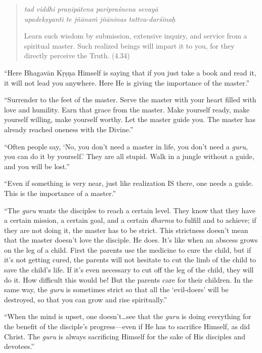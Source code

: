 \documentclass[12pt, twoside, openright]{memoir}
\begin{document}
\par
\begin{verse}
\textit{tad viddhi praṇipātena paripraśnena sevayā} \\
\textit{upadekṣyanti te jñānaṁ jñāninas tattva-darśinaḥ}

\noindent Learn such wisdom by submission, extensive inquiry, and service from a spiritual master. Such realized beings will impart it to you, for they directly perceive the Truth. (4.34)
\end{verse}
\par


\enquote{Here Bhagavān Kṛṣṇa Himself is saying that if you just take a book and read it, it will not lead you anywhere. Here He is giving the importance of the master.}

\enquote{Surrender to the feet of the master. Serve the master with your heart filled with love and humility. Earn that grace from the master. Make yourself ready, make yourself willing, make yourself worthy. Let the master guide you. The master has already reached oneness with the Divine.}

\enquote{Often people say, \enquote{No, you don’t need a master in life, you don’t need a \textit{guru}, you can do it by yourself.} They are all stupid. Walk in a jungle without a guide, and you will be lost.}

\enquote{Even if something is very near, just like realization IS there, one needs a guide. This is the importance of a master.}

\enquote{The \textit{guru} wants the disciples to reach a certain level. They know that they have a certain mission, a certain goal, and a certain \textit{dharma} to fulfill and to achieve; if they are not doing it, the master has to be strict. This strictness doesn’t mean that the master doesn’t love the disciple. He does. It’s like when an abscess grows on the leg of a child. First the parents use the medicine to cure the child, but if it’s not getting cured, the parents will not hesitate to cut the limb of the child to save the child’s life. If it’s even necessary to cut off the leg of the child, they will do it. How difficult this would be! But the parents care for their children. In the same way, the \textit{guru} is sometimes strict so that all the \enquote{evil-doers} will be destroyed, so that you can grow and rise spiritually.}

\enquote{When the mind is upset, one doesn’t\ldots see that the \textit{guru} is doing everything for the benefit of the disciple’s progress---even if He has to sacrifice Himself, as did Christ. The \textit{guru} is always sacrificing Himself for the sake of His disciples and devotees.}
\end{document}

